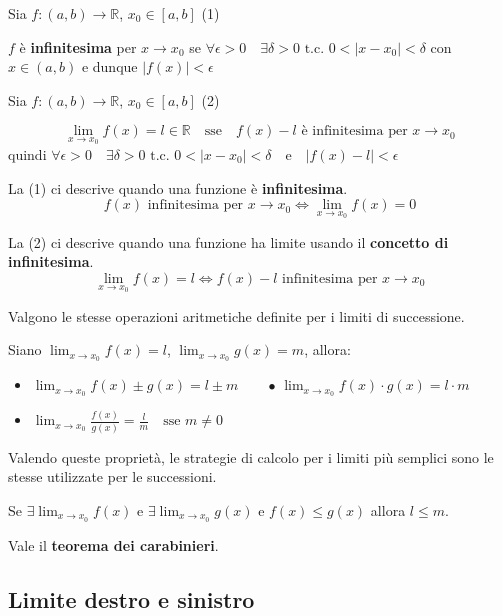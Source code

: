 \documentclass[12pt]{report}
\newcommand{\R}{\mathbb{R}}
\begin{document}
	Sia $f: (a, b) \to \R$, $x_0 \in [a, b]$ (1)
	
	$f$ è \textbf{infinitesima} per $x \to x_0$ se $\forall \epsilon > 0 \quad \exists \delta > 0 \text{ t.c. } 0 < |x - x_0| < \delta$ con $x \in (a, b)$ e dunque $|f(x)| < \epsilon$
	
	Sia $f: (a, b) \to \R$, $x_0 \in [a, b]$ (2)
	
	\[
	\lim_{x \to x_0} f(x) = l \in \R \quad \text{sse} \quad f(x) - l \text{ è infinitesima per } x \to x_0
	\]
	quindi $\forall \epsilon > 0 \quad \exists \delta > 0 \text{ t.c. } 0 < |x - x_0| < \delta \quad \text{e} \quad |f(x) - l| < \epsilon$
	
	\vspace{1em}
	
	La (1) ci descrive quando una funzione è \textbf{infinitesima}.
	\[
	f(x) \text{ infinitesima per } x \to x_0 \iff \lim_{x \to x_0} f(x) = 0
	\]
	
	La (2) ci descrive quando una funzione ha limite usando il \textbf{concetto di infinitesima}.
	\[
	\lim_{x \to x_0} f(x) = l \iff f(x) - l \text{ infinitesima per } x \to x_0
	\]
	
	Valgono le stesse operazioni aritmetiche definite per i limiti di successione.
	
	Siano $\lim_{x \to x_0} f(x) = l$, $\lim_{x \to x_0} g(x) = m$, allora:
	
	\begin{itemize}
		
		\item $\lim_{x \to x_0} f(x) \pm g(x) = l \pm m
		\qquad \bullet \,\lim_{x \to x_0} f(x) \cdot g(x) = l \cdot m$
		
		\vspace{0.5em}
		
		\item $\lim_{x \to x_0} \frac{f(x)}{g(x)} = \frac{l}{m} \quad \text{sse } m \neq 0$
	\end{itemize}
	
	Valendo queste proprietà, le strategie di calcolo per i limiti più semplici sono le stesse utilizzate per le successioni.
	
	Se $\exists \lim_{x \to x_0} f(x)$ e $\exists \lim_{x \to x_0} g(x)$ e $f(x) \le g(x)$ allora $l \le m$.
	
	Vale il \textbf{teorema dei carabinieri}.
	
	\subsection{Limite destro e sinistro}
	
\end{document}

